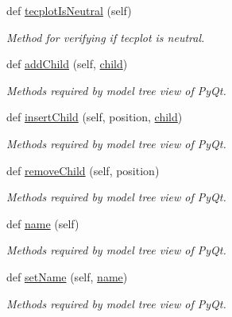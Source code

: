 \begin{DoxyCompactItemize}
def \hyperlink{classdata__structure_1_1case__node_1_1_case_node_ac8139ea04504dbaedeeb295d2db40cd7}{tecplot\+Is\+Neutral} (self)
\begin{DoxyCompactList}\small\item\em Method for verifying if tecplot is neutral. \end{DoxyCompactList}\item 
def \hyperlink{classdata__structure_1_1case__node_1_1_case_node_a5be02db2416888d37bf33c148a97bc0c}{add\+Child} (self, \hyperlink{classdata__structure_1_1case__node_1_1_case_node_ac5303eb8bbab69954feaa7205ba778aa}{child})
\begin{DoxyCompactList}\small\item\em Methods required by model tree view of Py\+Qt. \end{DoxyCompactList}\item 
def \hyperlink{classdata__structure_1_1case__node_1_1_case_node_a9f706863d3146d479a3be6d7737a6102}{insert\+Child} (self, position, \hyperlink{classdata__structure_1_1case__node_1_1_case_node_ac5303eb8bbab69954feaa7205ba778aa}{child})
\begin{DoxyCompactList}\small\item\em Methods required by model tree view of Py\+Qt. \end{DoxyCompactList}\item 
def \hyperlink{classdata__structure_1_1case__node_1_1_case_node_ac40fac97e12433646432658373d17bb5}{remove\+Child} (self, position)
\begin{DoxyCompactList}\small\item\em Methods required by model tree view of Py\+Qt. \end{DoxyCompactList}\item 
def \hyperlink{classdata__structure_1_1case__node_1_1_case_node_a73e2e5313f50260c6c767fef3c4b3ced}{name} (self)
\begin{DoxyCompactList}\small\item\em Methods required by model tree view of Py\+Qt. \end{DoxyCompactList}\item 
def \hyperlink{classdata__structure_1_1case__node_1_1_case_node_ae3f38c3ce20582e74e659a1657282c0e}{set\+Name} (self, \hyperlink{classdata__structure_1_1case__node_1_1_case_node_a73e2e5313f50260c6c767fef3c4b3ced}{name})
\begin{DoxyCompactList}\small\item\em Methods required by model tree view of Py\+Qt. \end{DoxyCompactList}\item 

\end{DoxyCompactItemize}
